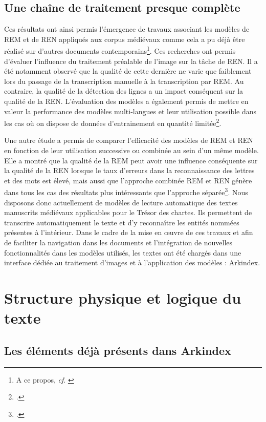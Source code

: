 \documentclass[a4paper,12pt,twoside]{book}
\begin{document}
	\subsection{Une chaîne de traitement presque complète}
	
	Ces résultats ont ainsi permis l'émergence de travaux associant les modèles de REM et de REN appliqués aux corpus médiévaux comme cela a pu déjà être réalisé sur d'autres documents contemporains\footnote{A ce propos, \textit{cf}. \cite{scheithauer_reconnaissanc_2021}}. Ces recherches ont permis d'évaluer l'influence du traitement préalable de l'image sur la tâche de REN. Il a été notamment observé que la qualité de cette dernière ne varie que faiblement lors du passage de la transcription manuelle à la transcription par REM. Au contraire, la qualité de la détection des lignes a un impact conséquent sur la qualité de la REN. L'évaluation des modèles a également permis de mettre en valeur la performance des modèles multi-langues et leur utilisation possible dans les cas où on dispose de données d'entrainement en quantité limitée\footcite{monroc_comprehensive_2022}. 
	
	Une autre étude a permis de comparer l'efficacité des modèles de REM et REN en fonction de leur utilisation successive ou combinée au sein d'un même modèle. Elle a montré que la qualité de la REM peut avoir une influence conséquente sur la qualité de la REN lorsque le taux d'erreurs dans la reconnaissance des lettres et des mots est élevé, mais aussi que l'approche combinée REM et REN génère dans tous les cas des résultats plus intéressants que l'approche séparée\footcite{boros_comparison_2020}. Nous disposons donc actuellement de modèles de lecture automatique des textes manuscrits médiévaux applicables pour le Trésor des chartes. Ils permettent de transcrire automatiquement le texte et d'y reconnaître les entités nommées présentes à l'intérieur. Dans le cadre de la mise en œuvre de ces travaux et afin de faciliter la navigation dans les documents et l'intégration de nouvelles fonctionnalités dans les modèles utilisés, les textes ont été chargés dans une interface dédiée au traitement d'images et à l'application des modèles : Arkindex.
	
	\section{Structure physique et logique du texte}
	
	\subsection{Les éléments déjà présents dans Arkindex}
	
\end{document}
